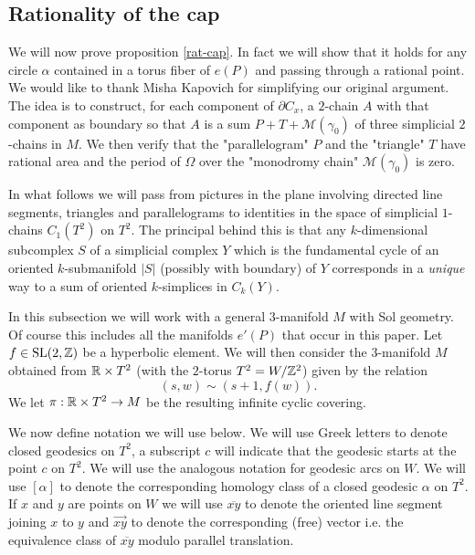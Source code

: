 \subsection{Rationality of the cap}\label{rat-cap11}
We will now prove proposition \ref{rat-cap}.  In fact we will show
that it holds for any circle $\alpha$ contained in a torus fiber
of $e(P)$ and passing through a rational point. We would like to
thank Misha Kapovich for simplifying  our original argument. The
idea is to construct, for each component of $\partial C_x$, a
$2$-chain $A$ with that component as boundary so that $A$ is a sum
$P+ T  +\mathcal{M}(\gamma_0)$ of three simplicial $2$-chains in
$M$. We then verify that the "parallelogram" $P$  and the "triangle"
$T$  have rational area and the period of $\Omega$ over the "monodromy
chain" $\mathcal{M}(\gamma_0)$ is zero.

In what follows we will pass from pictures in the plane involving
directed line segments, triangles and parallelograms to identities
in the space of simplicial $1$-chains $C_1(T^2)$  on $T^2$. The
principal behind this is that any $k$-dimensional subcomplex $S$
of a simplicial complex $Y$ which is the fundamental cycle of an
oriented $k$-submanifold $|S|$ (possibly with boundary) of $Y$
corresponds in a {\it unique} way to a sum of oriented $k$-simplices
in $C_k(Y)$.



In this subsection we will work with a general $3$-manifold $M$
with Sol geometry. Of course this includes all the manifolds $e'(P)$
that occur in this paper. Let $f \in \operatorname{SL}(2,\mathbb{Z})$ be a hyperbolic
element. We will then consider the $3$-manifold $M$ obtained from
$ \mathbb{R} \times T^2$ (with the $2$-torus $T^2 = W/ \mathbb{Z}^2$) given by the
relation
\begin{equation}\label{glueing}
(s,w) \sim (s+1,f(w)).  
\end{equation}
We let $\pi: \mathbb{R}\times T^2 \to M$ be the resulting infinite cyclic covering. 



We now define notation we will use below. We will use Greek letters
to denote closed geodesics on $T^2$, a subscript $c$  will indicate
that the geodesic starts at the point $c$ on $T^2$. We will use the
analogous notation for geodesic arcs on $W$.  We will use $[\alpha]$
to denote the corresponding homology class of a closed geodesic $\alpha$ on $T^2$. 
If $x$ and $y$ are points on $W$ we will use $\overline{xy}$ to
denote the oriented line segment joining $x$ to $y$ and
$\overrightarrow{xy}$ to denote the corresponding (free) vector
i.e. the equivalence class of $\overline{xy}$ modulo parallel translation. 
   
